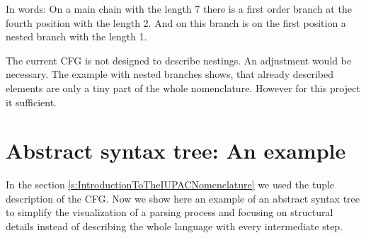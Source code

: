 \documentclass[
fontsize=11pt,
paper=a4,
abstract=true,
numbers=noenddot,
listof=totoc,
bibliography=totoc,
twoside,
open=right,
cleardoublepage=plain,
parskip=half+, %
BCOR=1cm, %
]{scrreprt}
\newcommand{\dashAndSpace}{\textendash \space}
\newcommand{\nonterminal}{non terminal}
\begin{document}
In words: On a main chain with the length 7 \dashAndSpace there is a first order branch at the fourth position with the length 2. And on this branch is on the first position a nested branch with the length 1.

The current CFG is not designed to describe nestings. An adjustment would be necessary. The example with nested branches shows, that already described elements are only a tiny part of the whole nomenclature. However for this project it sufficient.






\section{Abstract syntax tree: An example}\label{s:AbstractSyntaxTreeAnExample}
In the section \ref{s:IntroductionToTheIUPACNomenclature} we used the tuple description of the CFG. Now we show here an example of an abstract syntax tree to simplify the visualization of a parsing process and focusing on structural details instead of describing the whole language with every intermediate step.
\end{document}
